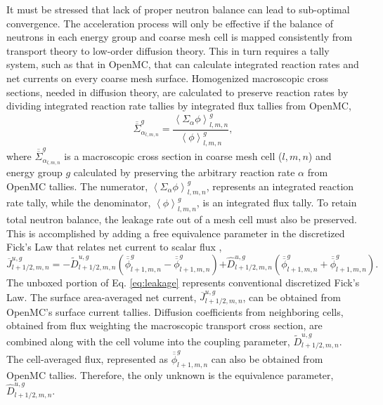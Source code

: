 \documentclass{ansconf}
\begin{document}
It must be stressed that lack of proper neutron balance can lead to sub-optimal
convergence. The acceleration process will only be effective if the balance of
neutrons in each energy group and coarse mesh cell is mapped consistently from
transport theory to low-order diffusion theory. This in turn requires a tally
system, such as that in OpenMC, that can calculate integrated reaction rates and
net currents on every coarse mesh surface. Homogenized macroscopic cross
sections, needed in diffusion theory, are calculated to preserve reaction rates
by dividing integrated reaction rate tallies by integrated flux tallies from
OpenMC,
\begin{equation}
  \label{eq:macro_xs}
  \overline{\overline{\Sigma}}_{\alpha_{l,m,n}}^{g} = \frac{\left\langle
    \Sigma_{\alpha}\phi \right\rangle_{l,m,n}^{g}} {\left\langle\phi
    \right\rangle_{l,m,n}^{g}},
\end{equation}
where $\overline{\overline{\Sigma}}_{\alpha_{l,m,n}}^{g}$ is a macroscopic cross section in
coarse mesh cell ($l,m,n$) and energy group $g$ calculated by preserving the
arbitrary reaction rate $\alpha$ from OpenMC tallies. The numerator,
$\left\langle\Sigma_{\alpha}\phi \right\rangle_{l,m,n}^{g}$, represents an
integrated reaction rate tally, while the denominator,
$\left\langle\phi\right\rangle_{l,m,n}^{g}$, is an integrated flux tally.  To
retain total neutron balance, the leakage rate out of a mesh cell must also be
preserved.  This is accomplished by adding a free equivalence parameter in the
discretized Fick's Law that relates net current to scalar flux
\cite{physor-smith-2002},
\begin{equation}
  \label{eq:leakage}
  \overline{J}_{l+1/2,m,n}^{u,g} = -\tilde{D}_{l+1/2,m,n}^{u,g}
  \left(\overline{\overline{\phi}}_{l+1,m,n}^{g} -
  \overline{\overline{\phi}}_{l+1,m,n}^{g} \right) \boxed{+
    \hat{D}_{l+1/2,m,n}^{u,g} \left(\overline{\overline{\phi}}_{l+1,m,n}^{g} +
    \overline{\overline{\phi}}_{l+1,m,n}^{g} \right)}.
\end{equation}
The unboxed portion of Eq. \eqref{eq:leakage} represents conventional
discretized Fick's Law. The surface area-averaged net current,
$\overline{J}_{l+1/2,m,n}^{u,g}$, can be obtained from OpenMC's surface current
tallies. Diffusion coefficients from neighboring cells, obtained from flux
weighting the macroscopic transport cross section, are combined along with the
cell volume into the coupling parameter, $\tilde{D}_{l+1/2,m,n}^{u,g}$. The
cell-averaged flux, represented as $\overline{\overline{\phi}}_{l+1,m,n}^{g}$
can also be obtained from OpenMC tallies.  Therefore, the only unknown is the
equivalence parameter, $\hat{D}_{l+1/2,m,n}^{u,g}$.
\end{document}
